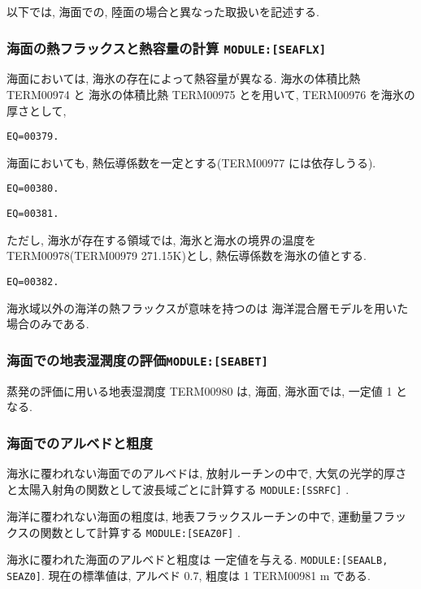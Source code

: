 \bigskip
以下では, 海面での, 陸面の場合と異なった取扱いを記述する.
\bigskip

\subsubsection{海面の熱フラックスと熱容量の計算 \texttt{MODULE:[SEAFLX]}}

海面においては, 海氷の存在によって熱容量が異なる.
海水の体積比熱 TERM00974 と
海氷の体積比熱 TERM00975 とを用いて, TERM00976 を海氷の厚さとして,
\begin{verbatim}
EQ=00379.
\end{verbatim}

海面においても, 熱伝導係数を一定とする(TERM00977 には依存しうる).
\begin{verbatim}
EQ=00380.
\end{verbatim}
\begin{verbatim}
EQ=00381.
\end{verbatim}

ただし, 海氷が存在する領域では, 
海氷と海水の境界の温度を TERM00978(TERM00979 271.15K)とし,
熱伝導係数を海氷の値とする.
\begin{verbatim}
EQ=00382.
\end{verbatim}

海氷域以外の海洋の熱フラックスが意味を持つのは
海洋混合層モデルを用いた場合のみである.

\subsubsection{海面での地表湿潤度の評価\texttt{MODULE:[SEABET]}}

蒸発の評価に用いる地表湿潤度 TERM00980 は,
海面, 海氷面では, 一定値 1 となる.

\subsubsection{海面でのアルベドと粗度}


海氷に覆われない海面でのアルベドは, 放射ルーチンの中で,
大気の光学的厚さと太陽入射角の関数として波長域ごとに計算する
\texttt{MODULE:[SSRFC]} .

海洋に覆われない海面の粗度は, 地表フラックスルーチンの中で,
運動量フラックスの関数として計算する
\texttt{MODULE:[SEAZ0F]} .

海氷に覆われた海面のアルベドと粗度は
一定値を与える.
\texttt{MODULE:[SEAALB, SEAZ0]}.
現在の標準値は, アルベド 0.7, 
粗度は 1 TERM00981 m である.

